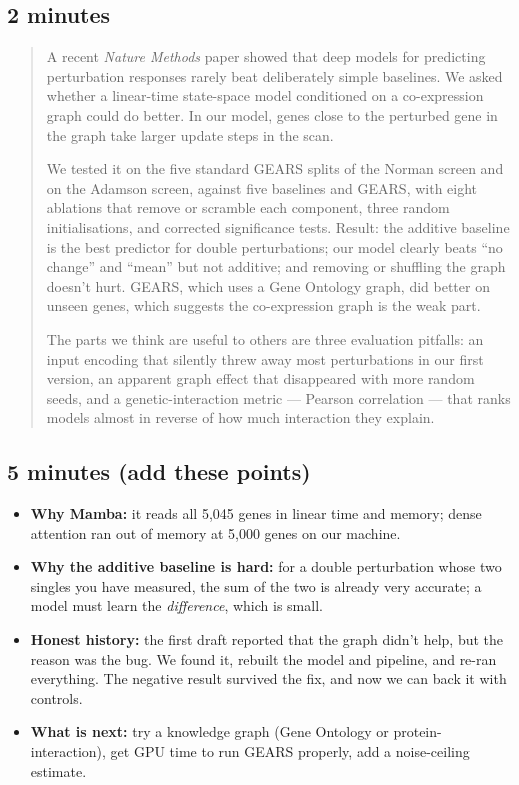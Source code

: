 \documentclass[10.5pt]{article}
\begin{document}
\subsection*{2 minutes}
\begin{quote}
A recent \emph{Nature Methods} paper showed that deep models for predicting perturbation responses rarely
beat deliberately simple baselines. We asked whether a linear-time state-space model conditioned on a
co-expression graph could do better. In our model, genes close to the perturbed gene in the graph take
larger update steps in the scan.

We tested it on the five standard GEARS splits of the Norman screen and on the Adamson screen, against five
baselines and GEARS, with eight ablations that remove or scramble each component, three random
initialisations, and corrected significance tests. Result: the additive baseline is the best predictor for
double perturbations; our model clearly beats ``no change'' and ``mean'' but not additive; and removing or
shuffling the graph doesn't hurt. GEARS, which uses a Gene Ontology graph, did better on unseen genes, which
suggests the co-expression graph is the weak part.

The parts we think are useful to others are three evaluation pitfalls: an input encoding that silently threw
away most perturbations in our first version, an apparent graph effect that disappeared with more random
seeds, and a genetic-interaction metric --- Pearson correlation --- that ranks models almost in reverse of
how much interaction they explain.
\end{quote}

\subsection*{5 minutes (add these points)}
\begin{itemize}
\item \textbf{Why Mamba:} it reads all 5,045 genes in linear time and memory; dense attention ran out of memory
at 5,000 genes on our machine.
\item \textbf{Why the additive baseline is hard:} for a double perturbation whose two singles you have
measured, the sum of the two is already very accurate; a model must learn the \emph{difference}, which is small.
\item \textbf{Honest history:} the first draft reported that the graph didn't help, but the reason was the
bug. We found it, rebuilt the model and pipeline, and re-ran everything. The negative result survived the fix,
and now we can back it with controls.
\item \textbf{What is next:} try a knowledge graph (Gene Ontology or protein-interaction), get GPU time to run
GEARS properly, add a noise-ceiling estimate.
\end{itemize}
\end{document}
